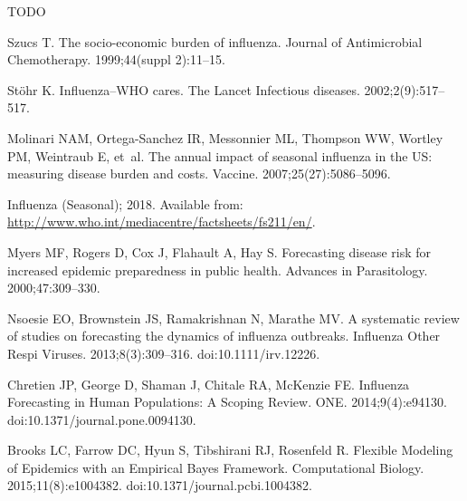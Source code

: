 \documentclass[10pt,letterpaper]{article}
\begin{document}
TODO

\nolinenumbers


%

\begin{thebibliography}{10}

Szucs T.
\newblock The socio-economic burden of influenza.
\newblock Journal of Antimicrobial Chemotherapy. 1999;44(suppl 2):11--15.

St{\"o}hr K.
\newblock Influenza--WHO cares.
\newblock The Lancet Infectious diseases. 2002;2(9):517--517.

Molinari NAM, Ortega-Sanchez IR, Messonnier ML, Thompson WW, Wortley PM,
  Weintraub E, et~al.
\newblock The annual impact of seasonal influenza in the US: measuring disease
  burden and costs.
\newblock Vaccine. 2007;25(27):5086--5096.

Influenza (Seasonal); 2018.
\newblock Available from:
  \url{http://www.who.int/mediacentre/factsheets/fs211/en/}.

Myers MF, Rogers D, Cox J, Flahault A, Hay S.
\newblock Forecasting disease risk for increased epidemic preparedness in
  public health.
\newblock Advances in Parasitology. 2000;47:309--330.

Nsoesie EO, Brownstein JS, Ramakrishnan N, Marathe MV.
\newblock A systematic review of studies on forecasting the dynamics of
  influenza outbreaks.
\newblock Influenza Other Respi Viruses. 2013;8(3):309--316.
\newblock doi:{10.1111/irv.12226}.

Chretien JP, George D, Shaman J, Chitale RA, McKenzie FE.
\newblock Influenza Forecasting in Human Populations: A Scoping Review.
 {ONE}. 2014;9(4):e94130.
\newblock doi:{10.1371/journal.pone.0094130}.

Brooks LC, Farrow DC, Hyun S, Tibshirani RJ, Rosenfeld R.
\newblock Flexible Modeling of Epidemics with an Empirical Bayes Framework.
 Computational Biology. 2015;11(8):e1004382.
\newblock doi:{10.1371/journal.pcbi.1004382}.


\end{thebibliography}
\end{document}
